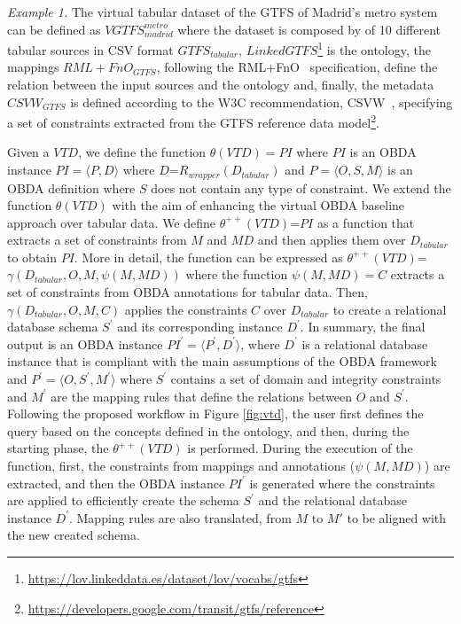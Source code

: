 \textit{Example 1.} The virtual tabular dataset of the GTFS of Madrid's metro system can be defined as $VGTFS^{metro}_{madrid}$ where the dataset is composed by of 10 different tabular sources in CSV format $GTFS_{tabular}$, $LinkedGTFS$\footnote{\url{https://lov.linkeddata.es/dataset/lov/vocabs/gtfs}} is the ontology, the mappings $RML+FnO_{GTFS}$, following the RML+FnO~\citep{de2017declarative} specification, define the relation between the input sources and the ontology and, finally, the metadata $CSVW_{GTFS}$ is defined according to the W3C recommendation, CSVW~\citep{tennison2015model}, specifying a set of constraints extracted from the GTFS reference data model\footnote{\url{https://developers.google.com/transit/gtfs/reference}}.


Given a $VTD$, we define the function $\theta(VTD)=PI$ where $PI$ is an OBDA instance $PI=\langle P,D\rangle$ where $D$=$R_{wrapper}(D_{tabular})$ and $P=\langle O,S,M\rangle$ is an OBDA definition where $S$ does not contain any type of constraint.
We extend the function $\theta(VTD)$ with the aim of enhancing the virtual OBDA baseline approach over tabular data. We define $\theta^{++}(VTD)$=$PI$ as a function that extracts a set of constraints from $M$ and $MD$ and then applies them over $D_{tabular}$ to obtain $PI$. More in detail, the function can be expressed as $\theta^{++}(VTD)$=$\gamma(D_{tabular},O,M,\psi(M,MD))$ where the function $\psi(M,MD)= C$ extracts a set of constraints from OBDA annotations for tabular data. Then, $\gamma(D_{tabular},O,M,C)$ applies the constraints $C$ over $D_{tabular}$ to create a relational database schema $S^{'}$ and its corresponding instance $D^{'}$. In summary, the final output is an OBDA instance $PI^{'}=\langle P^{'},D^{'}\rangle$, where $D^{'}$ is a relational database instance that is compliant with the main assumptions of the OBDA framework and $P^{'}=\langle O,S^{'},M^{'}\rangle$ where $S^{'}$ contains a set of domain and integrity constraints and $M^{'}$ are the mapping rules that define the relations between $O$ and $S^{'}$. Following the proposed workflow in Figure \ref{fig:vtd}, the user first defines the query based on the concepts defined in the ontology, and then, during the starting phase, the $\theta^{++}(VTD)$ is performed. During the execution of the function, first, the constraints from mappings and annotations ($\psi(M,MD)$) are extracted, and then the OBDA instance $PI^{'}$ is generated where the constraints are applied to efficiently create the schema $S^{'}$ and the relational database instance $D^{'}$. Mapping rules are also translated, from $M$ to $M{'}$ to be aligned with the new created schema.
